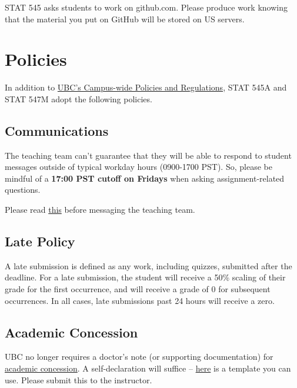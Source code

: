 \documentclass[
]{article}
\begin{document}
STAT 545 asks students to work on github.com. Please produce work
knowing that the material you put on GitHub will be stored on US
servers.

\hypertarget{policies}{%
\section{Policies}\label{policies}}

In addition to
\href{http://www.calendar.ubc.ca/vancouver/?tree=3,0,0,0}{UBC's
Campus-wide Policies and Regulations}, STAT 545A and STAT 547M adopt the
following policies.

\hypertarget{communications}{%
\subsection{Communications}\label{communications}}

The teaching team can't guarantee that they will be able to respond to
student messages outside of typical workday hours (0900-1700 PST). So,
please be mindful of a \textbf{17:00 PST cutoff on Fridays} when asking
assignment-related questions.

Please read \href{/slack_communication}{this} before messaging the
teaching team.

\hypertarget{late-policy}{%
\subsection{Late Policy}\label{late-policy}}

A late submission is defined as any work, including quizzes, submitted
after the deadline. For a late submission, the student will receive a
50\% scaling of their grade for the first occurrence, and will receive a
grade of 0 for subsequent occurrences. In all cases, late submissions
past 24 hours will receive a zero.

\hypertarget{academic-concession}{%
\subsection{Academic Concession}\label{academic-concession}}

UBC no longer requires a doctor's note (or supporting documentation) for
\href{http://www.calendar.ubc.ca/vancouver/index.cfm?tree=3,48,0,0}{academic
concession}. A self-declaration will suffice --
\href{/concession_template.pdf}{here} is a template you can use. Please
submit this to the instructor.
\end{document}
